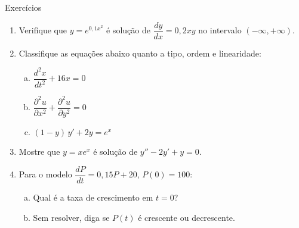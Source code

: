 \documentclass[12pt]{beamer}
\begin{document}
\begin{frame}{Exercícios}

  \begin{enumerate}
    \setlength\itemsep{8pt}

    \item Verifique que $y = e^{0{,}1x^2}$ é solução de
          $\dfrac{dy}{dx} = 0{,}2xy$ no intervalo $(-\infty, +\infty)$.

    \item Classifique as equações abaixo quanto a tipo, ordem e linearidade:
          \begin{enumerate}[(a)]
            \item $\dfrac{d^2x}{dt^2} + 16x = 0$
            \item $\dfrac{\partial^2 u}{\partial x^2}
                  + \dfrac{\partial^2 u}{\partial y^2} = 0$
            \item $(1-y)\,y' + 2y = e^x$
          \end{enumerate}

    \item Mostre que $y = xe^x$ é solução de $y'' - 2y' + y = 0$.

    \item Para o modelo $\dfrac{dP}{dt} = 0{,}15P + 20$, $P(0) = 100$:
          \begin{enumerate}[(a)]
            \item Qual é a taxa de crescimento em $t = 0$?
            \item Sem resolver, diga se $P(t)$ é crescente ou decrescente.
          \end{enumerate}

  \end{enumerate}

\end{frame}
\end{document}
